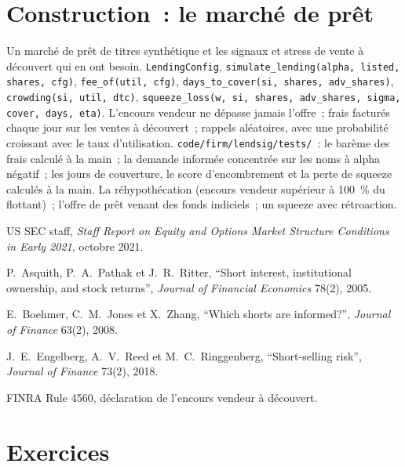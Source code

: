 \section{Construction~: le marché de prêt}\label{bld:s1:short-interest-borrow-and-crowding:lendsig}

\begin{build}
 Un marché de prêt de titres synthétique et les signaux et stress de vente à découvert qui en ont besoin.
 \texttt{LendingConfig}, \texttt{simulate\_lending(alpha, listed, shares, cfg)}, \texttt{fee\_of(util, cfg)},
\texttt{days\_to\_cover(si, shares, adv\_shares)}, \texttt{crowding(si, util, dtc)}, \texttt{squeeze\_loss(w, si, shares, adv\_shares, sigma, cover, days, eta)}.
 L'encours vendeur ne dépasse jamais l'offre~; frais facturés chaque jour sur les ventes à découvert~; rappels aléatoires, avec une probabilité croissant avec le taux d'utilisation.
 \texttt{code/firm/lendsig/tests/}~: le barème des frais calculé à la main~; la demande informée concentrée sur les noms à alpha négatif~; les jours de couverture,
le score d'encombrement et la perte de squeeze calculés à la main.
 La réhypothécation (encours vendeur supérieur à 100~\% du flottant)~; l'offre de prêt venant des fonds indiciels~; un squeeze avec rétroaction.
\end{build}

\begin{omsources}
\item US SEC staff, \emph{Staff Report on Equity and Options Market Structure Conditions in Early 2021}, octobre 2021.
\item P.~Asquith, P.~A.~Pathak et J.~R.~Ritter, ``Short interest, institutional ownership, and stock returns'', \emph{Journal of Financial Economics}
78(2), 2005.
\item E.~Boehmer, C.~M.~Jones et X.~Zhang, ``Which shorts are informed?'', \emph{Journal of Finance} 63(2), 2008.
\item J.~E.~Engelberg, A.~V.~Reed et M.~C.~Ringgenberg, ``Short-selling risk'', \emph{Journal of Finance} 73(2), 2018.
\item FINRA Rule 4560, déclaration de l'encours vendeur à découvert.
\end{omsources}

\section{Exercices}

